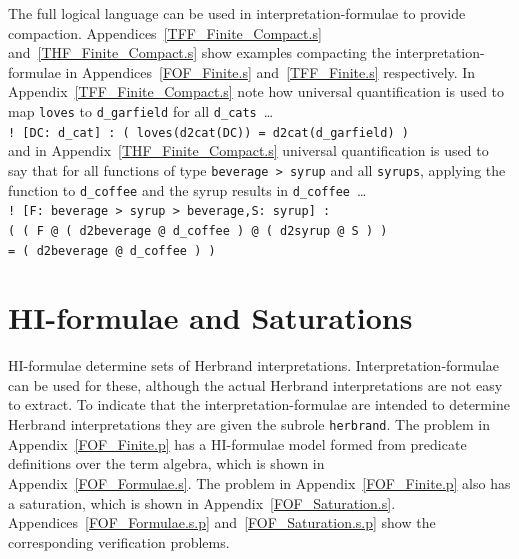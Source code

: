 \documentclass{easychair}
\newcommand{\smalltt}[1]{\small \texttt{#1}}
\begin{document}
The full logical language can be used in interpretation-formulae to provide compaction.
Appendices~\ref{TFF_Finite_Compact.s} and~\ref{THF_Finite_Compact.s} show examples compacting the
interpretation-formulae in Appendices~\ref{FOF_Finite.s} and~\ref{TFF_Finite.s} respectively.
In Appendix~\ref{TFF_Finite_Compact.s} note how universal quantification is used to map
{\tt loves} to {\tt d\_garfield} for all {\tt d\_cats}~\ldots \\
\hspace*{0.5cm}\smalltt{!\,[DC:\,d\_cat]\,:\,(\,loves(d2cat(DC))\,=\,d2cat(d\_garfield)\,)} \\
and in Appendix~\ref{THF_Finite_Compact.s} universal quantification is used to say that for all
functions of type {\tt beverage > syrup} and all {\tt syrups}, applying the function to
{\tt d\_coffee} and the syrup results in {\tt d\_coffee}~\ldots \\
\hspace*{0.5cm}\smalltt{!\,[F:\,beverage\,>\,syrup\,>\,beverage,S:\,syrup]\,:} \\
\hspace*{0.8cm}\smalltt{(\,(\,F\,@\,(\,d2beverage\,@\,d\_coffee\,)\,@\,(\,d2syrup\,@\,S\,)\,)} \\
\hspace*{0.8cm}\smalltt{=\,(\,d2beverage\,@\,d\_coffee\,)\,)}

\section{HI-formulae and Saturations}
\label{NewHerbrand}

HI-formulae determine sets of Herbrand interpretations.
Interpretation-formulae can be used for these, although the actual Herbrand interpretations are
not easy to extract.
To indicate that the interpretation-formulae are intended to determine Herbrand interpretations 
they are given the subrole {\tt herbrand}.
The problem in Appendix~\ref{FOF_Finite.p} has a HI-formulae model formed from predicate 
definitions over the term algebra, which is shown in Appendix~\ref{FOF_Formulae.s}.
The problem in Appendix~\ref{FOF_Finite.p} also has a saturation, which is shown in
Appendix~\ref{FOF_Saturation.s}.
Appendices~\ref{FOF_Formulae.s.p} and~\ref{FOF_Saturation.s.p} show the corresponding verification 
problems.

\end{document}
